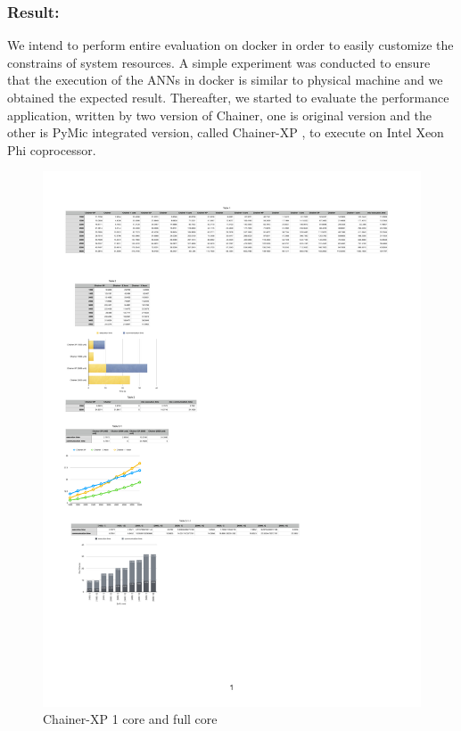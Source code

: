 \subsubsection{Result:}
%
We intend to perform entire evaluation on docker in order to easily customize the constrains of system resources. A simple experiment was conducted to ensure that the execution of the ANNs in docker is similar to physical machine and we obtained the expected result. Thereafter, we started to evaluate the performance  application, written by two version of Chainer, one is original version and the other is PyMic integrated version, called Chainer-XP , to execute on Intel Xeon Phi coprocessor.
\begin{figure}[]
\centering
\includegraphics[scale=0.6]{img/a.pdf}
\caption{Chainer-XP 1 core and full core}
\end{figure}

